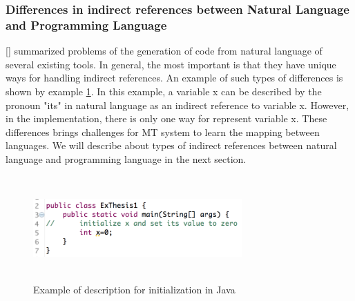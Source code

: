 \subsubsection{Differences in indirect references between Natural Language and Programming Language}
[\cite{Pulido-Prieto:2017:SNP:3145473.3109481}] summarized problems of the generation of code from natural language of several existing tools. In general, the most important is that they have unique ways for handling indirect references. An example of such types of differences is shown by example \ref{fig:XVarExample}. In this example, a variable x can be described by the pronoun "its" in natural language as an indirect reference to variable x. However, in the implementation, there is only one way for represent variable x. These differences brings challenges for MT system to learn the mapping between languages. We will describe about types of indirect references between natural language and programming language in the next section.
\begin{figure}[htp]
	\centering
	\includegraphics[width=8cm,height=4cm]{resources/fig_xvar_example.png}
	\caption[Example of description for initialization in Java ] {Example of description for initialization in Java}
	\label{fig:XVarExample}
\end{figure}

